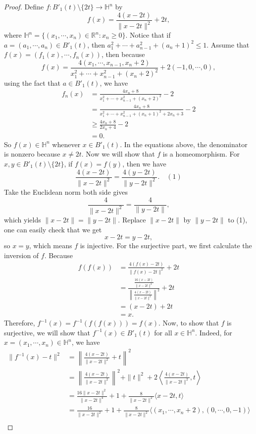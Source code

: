 \documentclass[12pt, a4paper]{article}
\theoremstyle{plain}
\newcommand{\Hs}{\mathbb{H}}
\newcommand{\R}{\mathbb{R}}
\begin{document}
\begin{proof}
	 Define $f:B'_1(t)\setminus\{2t\}\rightarrow \Hs^n $ by
	\[
	f(x)=\frac{4(x-2t)}{\|x-2t\|^2}+2t,
	\]
	where $\Hs^n=\{(x_1,\cdots,x_n)\in \R^n:x_n\geq 0\}$. Notice that if $a=(a_1,\cdots,a_n)\in B'_1(t)$, then $a_1^2+\cdots +a_{n-1}^2+(a_n+1)^2\leq 1$. Assume that $f(x)=(f_1(x),\cdots,f_n(x))$, then because
	\[
	f(x)=\frac{4(x_1,\cdots,x_{n-1},x_n+2)}{x_1^2+\cdots +x_{n-1}^2+(x_n+2)^2}+2(-1,0,\cdots,0),
	\]
	using the fact that $a\in B'_1(t)$, we have
	\begin{align*}
	f_n(x)&=\frac{4x_n+8}{x_1^2+\cdots +x_{n-1}^2+(x_n+2)^2}-2\\
	&= \frac{4x_n+8}{x_1^2+\cdots +x_{n-1}^2+(x_n+1)^2+2x_n+3}-2\\
	&\geq\frac{4x_n+8}{2x_n+4}-2\\
	&=0.
	\end{align*}
	So $f(x)\in \Hs^n$ whenever $x\in B'_1(t)$. In the equations above, the denominator is nonzero because $x\neq 2t$. Now	we will show that $f$ is a homeomorphism. For $x,y\in B'_1(t)\setminus\{2t\}$, if $f(x)=f(y)$, then we have 
	\[
	\frac{4(x-2t)}{\|x-2t\|^2}=\frac{4(y-2t)}{\|y-2t\|^2}.\quad (1)
	\]
	Take the Euclidean norm both side gives
	\[
	\frac{4}{\|x-2t\|^2}=\frac{4}{\|y-2t\|},
	\]
	which yields $\|x-2t\|=\|y-2t\|$. Replace $\|x-2t\|$ by $\|y-2t\|$ to (1), one can easily check that we get
	\[
	x-2t=y-2t,
	\] 
	so $x=y$, which means $f$ is injective. For the surjective part, we first calculate the inversion of $f$. Because
	\begin{align*}
	f(f(x))&=\frac{4(f(x)-2t)}{\|f(x)-2t\|^2}+2t\\
	&=\frac{\frac{16(x-2t)}{\|x-2t\|^2}}{\left\|\frac{4(x-2t)}{\|x-2t\|^2}\right\|^2}+2t\\
	&=(x-2t)+2t\\
	&=x.
	\end{align*}
	Therefore, $f^{-1}(x)=f^{-1}(f(f(x)))=f(x)$. Now, to show that $f$ is surjective, we will show that $f^{-1}(x)\in B'_1(t)$ for all $x\in \Hs^n$. Indeed, for $x=(x_1,\cdots,x_n)\in \Hs^n$, we have 
	\begin{align*}
	\|f^{-1}(x)-t\|^2 &= \left\| \frac{4(x-2t)}{\|x-2t\|^2}+t \right\|^2\\
	&= \left\| \frac{4(x-2t)}{\|x-2t\|^2}\right\|^2 +\|t\|^2+2\left\langle{\frac{4(x-2t)}{\|x-2t\|^2},t}\right\rangle\\
	&= \frac{16\|x-2t\|^2}{\|x-2t\|^4}+1+\frac{8}{\|x-2t\|^2}\langle{x-2t,t}\rangle\\
	&=\frac{16}{\|x-2t\|^2}+1+\frac{8}{\|x-2t\|^2}\langle{(x_1,\cdots,x_n+2),(0,\cdots,0,-1)}\rangle\\

\end{align*}
\end{proof}
\end{document}

